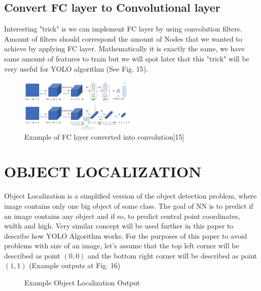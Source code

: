 \documentclass[letterpaper, 10 pt, conference]{ieeeconf}  %
\begin{document}
\subsection{Convert FC layer to Convolutional layer}
Interesting "trick" is we can implement FC layer by using convolution filters. Amount of filters should correspond the amount of Nodes that we wanted to achieve by applying FC layer.  Mathematically it is exactly the same, we have same amount of features to train but we will spot later that this "trick" will be very useful for YOLO algorithm (See Fig. 15). 

\begin{figure}[!ht]
	\centering
    \includegraphics[width=0.5\textwidth]{Pictures/FC_to_conv.png}
	\caption{Example of FC layer converted into convolution[15]}
\end{figure}

\section{OBJECT LOCALIZATION}

Object Localization is a simplified version of the object detection problem, where image contains only one big object of some class. The goal of NN is to predict if an image contains any object and if so, to predict central point coordinates, width and high. Very similar concept will be used further in this paper to describe how YOLO Algorithm works. For the purposes of this paper to avoid problems with size of an image, let's assume that the top left corner will be described as point $(0,0)$ and the bottom right corner  will be described as point $(1,1)$ (Example outputs at Fig. 16)

\begin{figure}[!ht]
	\centering

	\caption{Example Object Localization Output}
\end{figure}
\end{document}
